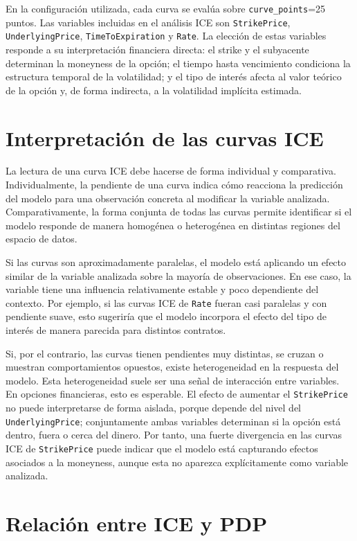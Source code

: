 En la configuración utilizada, cada curva se evalúa sobre \texttt{curve\_points}=25 puntos. Las variables incluidas en el análisis ICE son \texttt{StrikePrice}, \texttt{UnderlyingPrice}, \texttt{TimeToExpiration} y \texttt{Rate}. La elección de estas variables responde a su interpretación financiera directa: el strike y el subyacente determinan la moneyness de la opción; el tiempo hasta vencimiento condiciona la estructura temporal de la volatilidad; y el tipo de interés afecta al valor teórico de la opción y, de forma indirecta, a la volatilidad implícita estimada.

\section*{Interpretación de las curvas ICE}

La lectura de una curva ICE debe hacerse de forma individual y comparativa. Individualmente, la pendiente de una curva indica cómo reacciona la predicción del modelo para una observación concreta al modificar la variable analizada. Comparativamente, la forma conjunta de todas las curvas permite identificar si el modelo responde de manera homogénea o heterogénea en distintas regiones del espacio de datos.

Si las curvas son aproximadamente paralelas, el modelo está aplicando un efecto similar de la variable analizada sobre la mayoría de observaciones. En ese caso, la variable tiene una influencia relativamente estable y poco dependiente del contexto. Por ejemplo, si las curvas ICE de \texttt{Rate} fueran casi paralelas y con pendiente suave, esto sugeriría que el modelo incorpora el efecto del tipo de interés de manera parecida para distintos contratos.

Si, por el contrario, las curvas tienen pendientes muy distintas, se cruzan o muestran comportamientos opuestos, existe heterogeneidad en la respuesta del modelo. Esta heterogeneidad suele ser una señal de interacción entre variables. En opciones financieras, esto es esperable. El efecto de aumentar el \texttt{StrikePrice} no puede interpretarse de forma aislada, porque depende del nivel del \texttt{UnderlyingPrice}; conjuntamente ambas variables determinan si la opción está dentro, fuera o cerca del dinero. Por tanto, una fuerte divergencia en las curvas ICE de \texttt{StrikePrice} puede indicar que el modelo está capturando efectos asociados a la moneyness, aunque esta no aparezca explícitamente como variable analizada.

\section*{Relación entre ICE y PDP}

